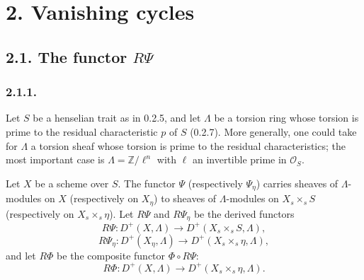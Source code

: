 \section*{2. Vanishing cycles}

\subsection*{2.1. The functor $R\Psi$}

\subsubsection*{2.1.1.}
Let $S$ be a henselian trait as in 0.2.5, and let $\Lambda$ be a
torsion ring whose torsion is prime to the residual characteristic
$p$ of $S$ (0.2.7).  More generally, one could take for $\Lambda$ a
torsion sheaf whose torsion is prime to the residual characteristics;
the most important case is
$\Lambda=\mathbb Z/\ell^n$ with $\ell$ an invertible prime in
$\mathcal O_S$.

Let $X$ be a scheme over $S$.  The functor $\Psi$ (respectively
$\Psi_\eta$) carries sheaves of $\Lambda$-modules on $X$
(respectively on $X_\eta$) to sheaves of $\Lambda$-modules on
$X_s\times_sS$ (respectively on $X_s\times_s\eta$).  Let $R\Psi$ and
$R\Psi_\eta$ be the derived functors
\begin{equation*}
R\Psi:D^+(X,\Lambda)\longrightarrow D^+(X_s\times_sS,\Lambda),
\end{equation*}
\begin{equation*}
R\Psi_\eta:D^+(X_\eta,\Lambda)
\longrightarrow D^+(X_s\times_s\eta,\Lambda),
\end{equation*}
and let $R\Phi$ be the composite functor $\Phi\circ R\Psi$:
\begin{equation*}
R\Phi:D^+(X,\Lambda)
\longrightarrow D^+(X_s\times_s\eta,\Lambda).
\end{equation*}

